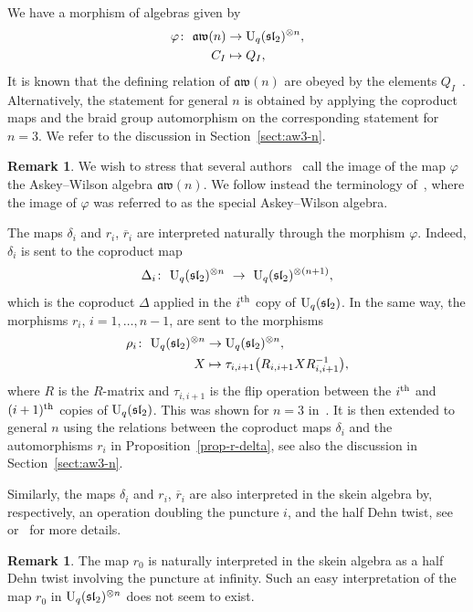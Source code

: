 \documentclass[10pt,a4paper]{amsart}
\numberwithin{equation}{section}
\newcommand{\vph}{\varphi}
\theoremstyle{definition}
\newtheorem{rema}[theo]{Remark}
\newcommand{\rb}{\overline{r}}
\newcommand{\aw}{\mathfrak{aw}(n)}
\begin{document}
We have a morphism of algebras given by
\begin{align*}%
\vph\colon\
\aw &\to {\rm U}_q(\mathfrak{sl}_2)^{\otimes n},\\
C_I &\mapsto Q_I,
\end{align*}
It is known that the defining relation of $\aw$ are obeyed by the elements $Q_I$~\cite{CL, DeC}. Alternatively, the statement for general $n$
is obtained by applying the coproduct maps and the braid group automorphism on
the corresponding statement for $n=3$. We refer to the discussion in Section~\ref{sect:aw3-n}.
\begin{rema}
We wish to stress that several authors~\cite{CL, DeC} call the image of the map $\vph$ the Askey--Wilson algebra $\mathfrak{aw}(n)$. We follow instead the terminology of~\cite{avatar}, where the image of $\vph$ was referred to as the special Askey--Wilson algebra.
\end{rema}
The maps $\delta_i$ and $r_i$, $\rb_i$ are interpreted naturally through the morphism $\vph$. Indeed, $\delta_i$ is sent to the coproduct map
\begin{equation*}
\Delta_i\colon \ {\rm U}_q(\mathfrak{sl}_2)^{\otimes n}\ \to \ {\rm U}_q(\mathfrak{sl}_2)^{\otimes (n+1)},
\end{equation*}
which is the coproduct $\Delta$ applied in the $i^{\rm th}$ copy of ${\rm U}_q(\mathfrak{sl}_2)$. In the same way, the morphisms $r_i$, $i=1,\dots,n-1$, are sent to the morphisms
\begin{align*}
\rho_i\colon \ {\rm U}_q(\mathfrak{sl}_2)^{\otimes n} &\to {\rm U}_q(\mathfrak{sl}_2)^{\otimes n},\\
 X & \mapsto \tau_{i,i+1}\big( R_{i,i+1} X R_{i,i+1}^{-1}\big),
\end{align*}
where $R$ is the $R$-matrix and $\tau_{i,i+1}$ is the flip operation between the $i^{\rm th}$ and $(i+1)^{\rm th}$ copies of ${\rm U}_q(\mathfrak{sl}_2)$. This was shown for $n=3$ in~\cite{CGVZ}. It is then extended to general $n$ using the relations between the coproduct maps $\delta_i$ and the automorphisms $r_i$ in Proposition~\ref{prop-r-delta}, see also the discussion in Section~\ref{sect:aw3-n}.

Similarly, the maps $\delta_i$ and $r_i$, $\rb_i$ are also interpreted in the skein algebra by, respectively, an operation doubling the puncture $i$, and the half Dehn twist, see~\cite{avatar} or~\cite{CL} for more details.
\begin{rema}
The map $r_0$ is naturally interpreted in the skein algebra as a half Dehn twist involving the puncture at infinity. Such an easy interpretation of the map $r_0$ in ${\rm U}_q(\mathfrak{sl}_2)^{\otimes n}$ does not seem to exist.
\end{rema}
\end{document}
